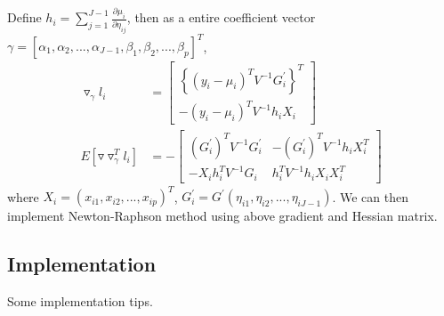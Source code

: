 Define $h_i = \sum_{j=1}^{J-1} \frac{\partial \mu_i}{\partial \eta_{ij}}$, then as a entire coefficient vector $\gamma = [\alpha_1, \alpha_2, ..., \alpha_{J-1}, \beta_1, \beta_2, ..., \beta_p]^T$,
\begin{align*}
\triangledown_\gamma l_i &= \left[ \begin{array}{c}
					\left\{(y_i - \mu_i)^T V^{-1} G_i^{\prime} \right\}^T \\
					-(y_i - \mu_i)^T V^{-1} h_i X_i
				   \end{array} \right] \\
E\left[\triangledown \triangledown^T_\gamma l_i\right] & = - \left[ \begin{array}{cc}
							(G_i^\prime)^T V^{-1} G_i^\prime & -(G_i^\prime)^T V^{-1} h_i X_i^T \\
							-X_i h_i^T V^{-1} G_i & h_i^T V^{-1} h_i X_iX_i^T
						      \end{array} 
						\right]
\end{align*}
where $X_i = (x_{i1}, x_{i2}, ... , x_{ip})^T$, $G_i^\prime = G^\prime(\eta_{i1},\eta_{i2},...,\eta_{iJ-1})$. We can then implement Newton-Raphson method using above gradient and Hessian matrix.

\subsection{Implementation}
Some implementation tips.

